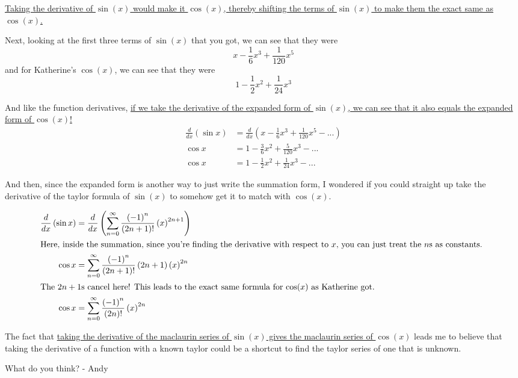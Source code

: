 \documentclass[12pt]{article}
\begin{document}
\uline{Taking the derivative of $\sin(x)$ would make it $\cos(x)$, thereby shifting the terms of $\sin(x)$ to make them the exact same as $\cos(x)$.}

Next, looking at the first three terms of $\sin(x)$ that you got, we can see that they were
$$x-\frac{1}{6}x^{3}+\frac{1}{120}x^{5}$$
and for Katherine's $\cos(x)$, we can see that they were
$$1-\frac{1}{2}x^{2}+\frac{1}{24}x^{3}$$

And like the function derivatives, \uline{if we take the derivative of the expanded form of $\sin(x)$, we can see that it also equals the expanded form of $\cos(x)$!}
\begin{align}
  \frac{d}{dx}\left(\sin x\right) & =\frac{d}{dx}\left(x-\frac{1}{6}x^{3}+\frac{1}{120}x^{5}-...\right) \\
  \cos x                          & =1-\frac{3}{6}x^{2}+\frac{5}{120}x^{3}-...                          \\
  \cos x                          & =1-\frac{1}{2}x^{2}+\frac{1}{24}x^{3}-...
\end{align}

And then, since the expanded form is another way to just write the summation form, I wondered if you could straight up take the derivative of the taylor formula of $\sin(x)$ to somehow get it to match with $\cos(x)$.

\begin{align}
  \frac{d}{dx}\left(\sin x\right) & =\frac{d}{dx}\left(\sum_{n=0}^{\infty}\frac{\left(-1\right)^{n}}{\left(2n+1\right)!}\left(x\right)^{2n+1}\right) \\
  \intertext{Here, inside the summation, since you're finding the derivative with respect to $x$, you can just treat the $n$s as constants. }
  \cos x                          & =\sum_{n=0}^{\infty}\frac{\left(-1\right)^{n}}{\left(2n+1\right)!}\left(2n+1\right)\left(x\right)^{2n}           \\
  \intertext{The $2n+1$s cancel here! This leads to the exact same formula for $\cos(x)$ as Katherine got. }
  \cos x                          & =\sum_{n=0}^{\infty}\frac{\left(-1\right)^{n}}{\left(2n\right)!}\left(x\right)^{2n}                              \\
\end{align}

The fact that \uline{taking the derivative of the maclaurin series of $\sin(x)$ gives the maclaurin series of $\cos(x)$} leads me to believe that taking the derivative of a function with a known taylor could be a shortcut to find the taylor series of one that is unknown.

What do you think?
\bigbreak
- Andy
\end{document}
